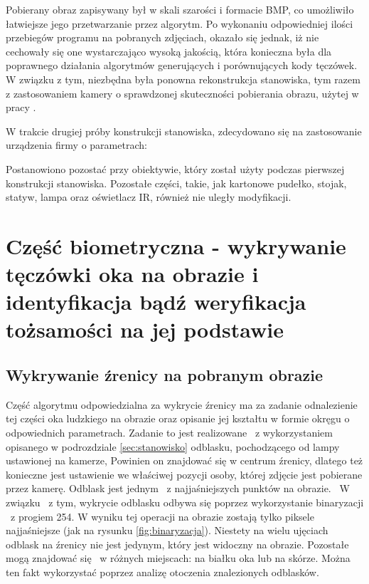 Pobierany obraz zapisywany był w skali szarości i formacie BMP, co umożliwiło łatwiejsze jego przetwarzanie przez algorytm. Po wykonaniu odpowiedniej ilości przebiegów programu na pobranych zdjęciach, okazało się jednak, iż nie cechowały się one wystarczająco wysoką jakością, która konieczna była dla poprawnego działania algorytmów generujących i porównujących kody tęczówek. W związku z tym, niezbędna była ponowna rekonstrukcja stanowiska, tym razem z zastosowaniem kamery o sprawdzonej skuteczności pobierania obrazu, użytej w pracy \cite{Gl11}.

W trakcie drugiej próby konstrukcji stanowiska, zdecydowano się na zastosowanie urządzenia firmy o parametrach: 

Postanowiono pozostać przy obiektywie, który został użyty podczas pierwszej konstrukcji stanowiska. Pozostałe części, takie, jak kartonowe pudełko, stojak, statyw, lampa oraz oświetlacz IR, również nie uległy modyfikacji.

\section{Część biometryczna - wykrywanie tęczówki oka na obrazie i identyfikacja bądź weryfikacja tożsamości na jej podstawie}
\subsection{Wykrywanie źrenicy na pobranym obrazie}
\label{sec:wykrycieZrenicy}
Część algorytmu odpowiedzialna za wykrycie źrenicy ma za zadanie odnalezienie tej części oka ludzkiego na obrazie oraz opisanie jej kształtu w formie okręgu o odpowiednich parametrach. Zadanie to jest realizowane ~z wykorzystaniem opisanego w podrozdziale \ref{sec:stanowisko} odblasku, pochodzącego od lampy ustawionej na kamerze, Powinien on znajdować się w centrum źrenicy, dlatego też konieczne jest ustawienie we właściwej pozycji osoby, której zdjęcie jest pobierane przez kamerę. Odblask jest jednym ~z najjaśniejszych punktów na obrazie. ~W związku ~z tym, wykrycie odblasku odbywa się poprzez wykorzystanie binaryzacji ~z progiem 254. W wyniku tej operacji na obrazie zostają tylko piksele najjaśniejsze (jak na rysunku \ref{fig:binaryzacja}). Niestety na wielu ujęciach odblask na źrenicy nie jest jedynym, który jest widoczny na obrazie. Pozostałe mogą znajdować się ~w różnych miejscach: na białku oka lub na skórze. Można ten fakt wykorzystać poprzez analizę otoczenia znalezionych odblasków. 

